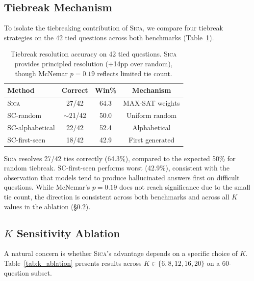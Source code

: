 \documentclass[11pt,a4paper]{article}
\newcommand{\sica}{\textsc{Sica}}
\begin{document}
\subsection{Tiebreak Mechanism}
\label{sec:tiebreak}

To isolate the tiebreaking contribution of \sica{}, we compare four tiebreak strategies on the 42 tied questions across both benchmarks (Table~\ref{tab:tiebreak}).

\begin{table}[t]
\centering
\small
\begin{tabular}{lccc}
\toprule
\textbf{Method} & \textbf{Correct} & \textbf{Win\%} & \textbf{Mechanism} \\
\midrule
\sica{} & 27/42 & 64.3 & MAX-SAT weights \\
SC-random & $\sim$21/42 & 50.0 & Uniform random \\
SC-alphabetical & 22/42 & 52.4 & Alphabetical \\
SC-first-seen & 18/42 & 42.9 & First generated \\
\bottomrule
\end{tabular}
\caption{Tiebreak resolution accuracy on 42 tied questions. \sica{} provides principled resolution (+14pp over random), though McNemar $p{=}0.19$ reflects limited tie count.}
\label{tab:tiebreak}
\end{table}

\sica{} resolves 27/42 ties correctly (64.3\%), compared to the expected 50\% for random tiebreak.
SC-first-seen performs worst (42.9\%), consistent with the observation that models tend to produce hallucinated answers first on difficult questions.
While McNemar's $p{=}0.19$ does not reach significance due to the small tie count, the direction is consistent across both benchmarks and across all $K$ values in the ablation (\S\ref{sec:k_ablation}).

\subsection{$K$ Sensitivity Ablation}
\label{sec:k_ablation}

A natural concern is whether \sica{}'s advantage depends on a specific choice of $K$.
Table~\ref{tab:k_ablation} presents results across $K \in \{6, 8, 12, 16, 20\}$ on a 60-question subset.
\end{document}

